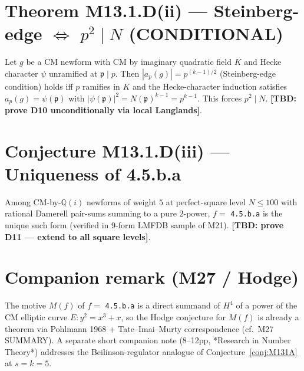 \section{Theorem M13.1.D(ii) — Steinberg-edge $\Leftrightarrow$ $p^2\mid N$ (CONDITIONAL)}

\begin{theorem}[M13.1.D(ii); conditional on D10]
\label{thm:M131Dsteinberg}
Let $g$ be a CM newform with CM by imaginary quadratic field $K$ and Hecke
character $\psi$ unramified at $\mathfrak{p}\mid p$. Then $|a_p(g)| = p^{(k-1)/2}$
(Steinberg-edge condition) holds iff $p$ ramifies in $K$ and the Hecke-character
induction satisfies $a_p(g) = \psi(\mathfrak{p})$ with $|\psi(\mathfrak{p})|^2
= N(\mathfrak{p})^{k-1} = p^{k-1}$. This forces $p^2 \mid N$.
\textbf{[TBD: prove D10 unconditionally via local Langlands]}.
\end{theorem}

\section{Conjecture M13.1.D(iii) — Uniqueness of 4.5.b.a}

\begin{conjecture}[M13.1.D(iii)]
\label{conj:M131Dunique}
Among CM-by-$\mathbb{Q}(i)$ newforms of weight $5$ at perfect-square level
$N \leq 100$ with rational Damerell pair-sums summing to a pure $2$-power,
$f = $ \texttt{4.5.b.a} is the unique such form (verified in 9-form LMFDB
sample of M21). \textbf{[TBD: prove D11 — extend to all square levels]}.
\end{conjecture}

\section*{Companion remark (M27 / Hodge)}

The motive $M(f)$ of $f = $ \texttt{4.5.b.a} is a direct summand of $H^4$
of a power of the CM elliptic curve $E:y^2=x^3+x$, so the Hodge conjecture
for $M(f)$ is already a theorem via Pohlmann 1968 + Tate–Imai–Murty
correspondence (cf.\ M27 SUMMARY). A separate short companion note
(8--12pp, *Research in Number Theory*) addresses the Beilinson-regulator
analogue of Conjecture~\ref{conj:M131A} at $s=k=5$.
